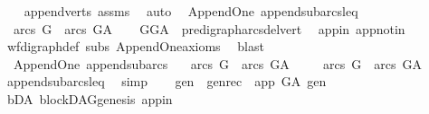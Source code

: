 \begin{isabellebody}
%
\isadelimproof
\ \ %
\endisadelimproof
%
\isatagproof
{}\isamarkupfalse%
\ append{\isacharunderscore}{\kern0pt}verts\ assms\ \isamarkupfalse%
\ auto%
\endisatagproof
{\isafoldproof}%
%
\isadelimproof
\isanewline
%
\endisadelimproof
\isanewline
{}\isamarkupfalse%
\ {\isacharparenleft}{\kern0pt}\ Append{\isacharunderscore}{\kern0pt}One{\isacharparenright}{\kern0pt}\ append{\isacharunderscore}{\kern0pt}subarcs{\isacharunderscore}{\kern0pt}leq{\isacharcolon}{\kern0pt}\ \isanewline
\ \ {\isachardoublequoteopen}arcs\ G\ {\isasymsubseteq}\ arcs\ G{\isacharunderscore}{\kern0pt}A{\isachardoublequoteclose}\isanewline
%
\isadelimproof
\ \ %
\endisadelimproof
%
\isatagproof
{}\isamarkupfalse%
\ GG{\isacharunderscore}{\kern0pt}A\ \ pre{\isacharunderscore}{\kern0pt}digraph{\isachardot}{\kern0pt}arcs{\isacharunderscore}{\kern0pt}del{\isacharunderscore}{\kern0pt}vert\ \isamarkupfalse%
\ app{\isacharunderscore}{\kern0pt}in\ app{\isacharunderscore}{\kern0pt}notin\ \isanewline
\ \ \isamarkupfalse%
\ wf{\isacharunderscore}{\kern0pt}digraph{\isacharunderscore}{\kern0pt}def\ subs\ Append{\isacharunderscore}{\kern0pt}One{\isacharunderscore}{\kern0pt}axioms\ \isamarkupfalse%
\ blast%
\endisatagproof
{\isafoldproof}%
%
\isadelimproof
\isanewline
%
\endisadelimproof
\ \ \isanewline
{}\isamarkupfalse%
\ {\isacharparenleft}{\kern0pt}\ Append{\isacharunderscore}{\kern0pt}One{\isacharparenright}{\kern0pt}\ append{\isacharunderscore}{\kern0pt}subarcs{\isacharcolon}{\kern0pt}\ \isanewline
\ \ {\isachardoublequoteopen}arcs\ G\ {\isasymsubset}\ arcs\ G{\isacharunderscore}{\kern0pt}A{\isachardoublequoteclose}\isanewline
%
\isadelimproof
%
\endisadelimproof
%
\isatagproof
{}\isamarkupfalse%
\isanewline
\ \ \isamarkupfalse%
\ \ {\isachardoublequoteopen}arcs\ G\ {\isasymsubseteq}\ arcs\ G{\isacharunderscore}{\kern0pt}A{\isachardoublequoteclose}\ \isamarkupfalse%
\ append{\isacharunderscore}{\kern0pt}subarcs{\isacharunderscore}{\kern0pt}leq\ \isamarkupfalse%
\ simp\isanewline
\ \ \isamarkupfalse%
\ gen\ \ gen{\isacharunderscore}{\kern0pt}rec{\isacharcolon}{\kern0pt}\ {\isachardoublequoteopen}\ app\ {\isasymrightarrow}\isactrlsup {\isacharplus}{\kern0pt}\isactrlbsub G{\isacharunderscore}{\kern0pt}A\isactrlesub \ gen{\isachardoublequoteclose}\ \isamarkupfalse%
\ bD{\isacharunderscore}{\kern0pt}A\ blockDAG{\isachardot}{\kern0pt}genesis\ app{\isacharunderscore}{\kern0pt}in\isanewline

\end{isabellebody}
